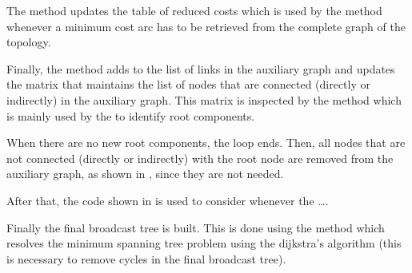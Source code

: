 The  method updates the table of reduced costs which is used by
the  method whenever a minimum cost arc has to be retrieved
from the complete graph of the topology.

Finally, the  method adds  to the list of links in
the auxiliary graph and updates the  matrix that maintains the
list of nodes that are connected (directly or indirectly) in the auxiliary
graph. This matrix is inspected by the  method which is
mainly used by the  to identify root components.

When there are no new root components, the loop ends. Then, all nodes that are
not connected (directly or indirectly) with the root node are removed from the
auxiliary graph, as shown in , since they are
not needed.



After that, the code shown in  is used to
consider whenever the \ldots.



Finally the final broadcast tree is built. This is done using the
 method which resolves the minimum spanning tree
problem using the dijkstra's algorithm (this is necessary to remove cycles in
the final broadcast tree).
